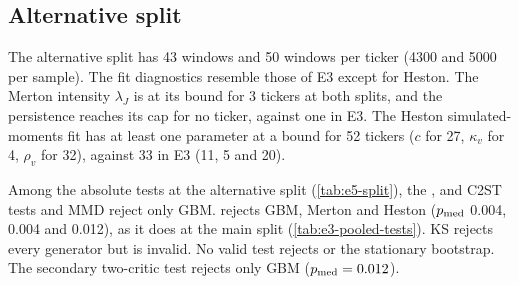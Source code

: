 \subsection{Alternative split}

The alternative split has 43 \TEST{} windows and 50 \TRAIN{} windows per ticker (4300 and 5000 per
sample). The fit diagnostics resemble those of E3 except for Heston. The Merton intensity
$\lambda_J$ is at its bound for 3 tickers at both splits, and the \GARCHt{} persistence reaches its
cap for no ticker, against one in E3. The Heston simulated-moments fit has at least one parameter
at a bound for 52 tickers ($c$ for 27, $\kappa_v$ for 4, $\rho_v$ for 32), against 33 in E3 (11, 5
and 20).

Among the absolute tests at the alternative split (\cref{tab:e5-split}), the \WC{}, \LRC{} and
C2ST tests and MMD reject only GBM. \SigMMD{} rejects GBM, Merton and Heston ($p_{\mathrm{med}}$ 0.004,
0.004 and 0.012), as it does at the main split (\cref{tab:e3-pooled-tests}). KS rejects every
generator but is invalid. No valid test rejects \GARCHt{} or the stationary bootstrap. The
secondary two-critic test rejects only GBM ($p_{\mathrm{med}}=0.012$).

\begin{table}[tbp]
  \centering
  \caption{Alternative split, full E3 battery: \TRAIN{} 2018-01-03 to 2021-12-31, \TEST{}
    2022-01-03 to 2025-06-16, same 100 tickers, generators refitted; five synthetic seeds;
    $\alpha=0.05$. Rule power and boundary size, and the main split: \cref{tab:manual-e5-split};
    the same battery at the main split: \cref{tab:e3-pooled-tests}.}
  \label{tab:e5-split}
  \small
\end{table}


